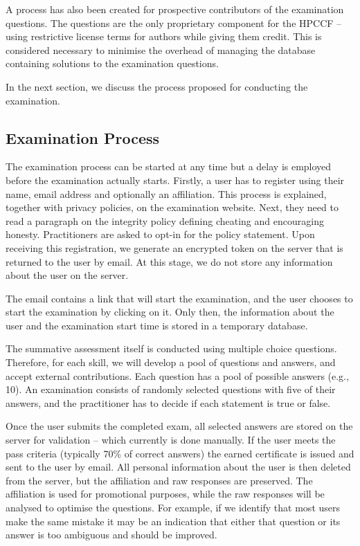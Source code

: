 \documentclass[jocse]{jocseart}
\begin{document}
A process has also been created for prospective contributors of the examination questions.
The questions are the only proprietary component for the HPCCF -- using restrictive license terms for authors while giving them credit.
This is considered necessary to minimise the overhead of managing the database containing solutions to the examination questions.

In the next section, we discuss the process proposed for conducting the examination.

\subsection{Examination Process}

The examination process can be started at any time but a delay is employed before the examination actually starts.
Firstly, a user has to register using their name, email address and optionally an affiliation.
This process is explained, together with privacy policies, on the examination website.
Next, they need to read a paragraph on the integrity policy defining cheating and encouraging honesty.
Practitioners are asked to opt-in for the policy statement.
Upon receiving this registration, we generate an encrypted token on the server that is returned to the user by email.
At this stage, we do not store any information about the user on the server.

The email contains a link that will start the examination, and the user chooses to start the examination by clicking on it. Only then, the information about the user and the examination start time is stored in a temporary database.

The summative assessment itself is conducted using multiple choice questions.
Therefore, for each skill, we will develop a pool of questions and answers, and accept external contributions.
Each question has a pool of possible answers (e.g., 10). An examination consists of randomly selected questions with five of their answers, and the practitioner has to decide if each statement is true or false.

Once the user submits the completed exam, all selected answers are stored on the server for validation -- which currently is done manually.
If the user meets the pass criteria (typically 70\% of correct answers) the earned certificate is issued and sent to the user by email.
All personal information about the user is then deleted from the server, but the affiliation and raw responses are preserved.
The affiliation is used for promotional purposes, while the raw responses will be analysed to optimise the questions.
For example, if we identify that most users make the same mistake it may be an indication that either that question or its answer is too ambiguous and should be improved.
\end{document}
